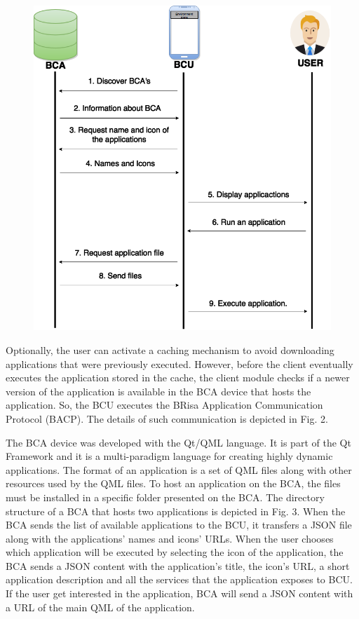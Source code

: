 \documentclass[journal]{IEEEtran}
\begin{document}
\begin{figure}[tb]
    \includegraphics[scale = 0.36]{FIG1}    
\end{figure}

Optionally, the user can activate a caching mechanism to avoid downloading applications that were previously executed. However, before the client eventually executes the application stored in the cache, the client module checks if a newer version of the application is available in the BCA device that hosts the application. So, the BCU executes the BRisa Application Communication Protocol (BACP). The details of such communication  is depicted in Fig. 2.

The BCA device was developed with the Qt/QML language. It is part of the Qt Framework and it is a multi-paradigm language for creating highly dynamic applications. The format of an application is a set of QML files along with other resources used by the QML files. To host an application on the BCA, the files must be installed in a specific folder presented on the BCA. The directory structure of a BCA that hosts two applications is depicted in Fig. 3. When the BCA sends the list of available applications to the BCU, it transfers a JSON file along with the applications' names and icons' URLs. When the user chooses which application will be executed by selecting the icon of the application, the BCA sends a JSON content with the application's title, the icon's URL, a short application description and all the services that the application exposes to BCU. If the user get interested in the application, BCA will send a JSON content with a URL of the main QML of the application. 
\end{document}
